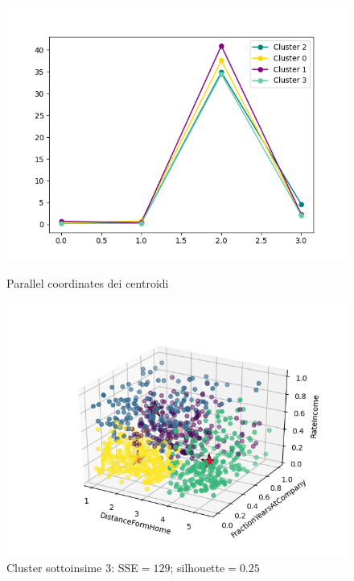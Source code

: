 \documentclass[a4paper,9pt]{article}
\begin{document}
\begin{figure}[H]
\begin{minipage}[b]{0.47\textwidth}
\centering
\includegraphics[width=\textwidth]{par_cor_centroid8.png}
\caption{Parallel coordinates dei centroidi}
\label{etichetta1}
\end{minipage}
\hfill
\begin{minipage}[b]{0.55\textwidth}
\includegraphics[scale=0.6]{rate_frac_dist8.png}
\caption{Cluster sottoinsime 3: SSE$=129$; silhouette$=0.25$}
\label{etichetta2}
\end{minipage}
\end{figure}
\end{document}
